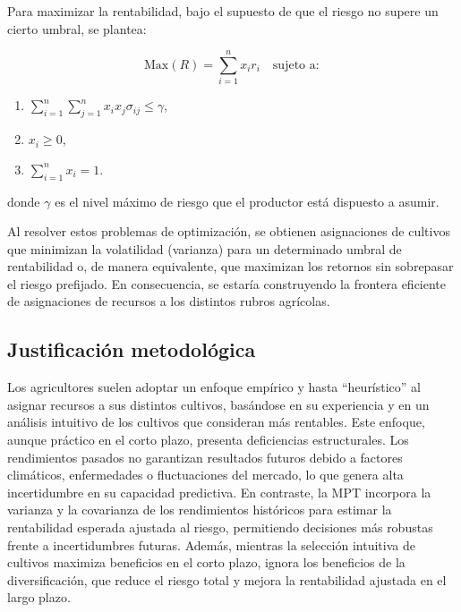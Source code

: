\documentclass[
  letterpaper,
  DIV=11,
  numbers=noendperiod]{scrartcl}
\providecommand{\tightlist}{%
  \setlength{\itemsep}{0pt}\setlength{\parskip}{0pt}}\usepackage{longtable,booktabs,array}
\begin{document}
Para maximizar la rentabilidad, bajo el supuesto de que el riesgo no
supere un cierto umbral, se plantea:

\[
\text{Max}(R) = \sum_{i=1}^n x_i r_i \quad \text{sujeto a}:
\]

\begin{enumerate}
\def\labelenumi{\arabic{enumi}.}
\tightlist
\item
  \(\sum_{i=1}^n \sum_{j=1}^n x_i x_j \sigma_{ij} \leq \gamma\),\\
\item
  \(x_i \geq 0\),\\
\item
  \(\sum_{i=1}^n x_i = 1\).
\end{enumerate}

donde \(\gamma\) es el nivel máximo de riesgo que el productor está
dispuesto a asumir.

Al resolver estos problemas de optimización, se obtienen asignaciones de
cultivos que minimizan la volatilidad (varianza) para un determinado
umbral de rentabilidad o, de manera equivalente, que maximizan los
retornos sin sobrepasar el riesgo prefijado. En consecuencia, se estaría
construyendo la frontera eficiente de asignaciones de recursos a los
distintos rubros agrícolas.

\subsection{Justificación
metodológica}\label{justificaciuxf3n-metodoluxf3gica}

Los agricultores suelen adoptar un enfoque empírico y hasta
``heurístico'' al asignar recursos a sus distintos cultivos, basándose
en su experiencia y en un análisis intuitivo de los cultivos que
consideran más rentables. Este enfoque, aunque práctico en el corto
plazo, presenta deficiencias estructurales. Los rendimientos pasados no
garantizan resultados futuros debido a factores climáticos, enfermedades
o fluctuaciones del mercado, lo que genera alta incertidumbre en su
capacidad predictiva. En contraste, la MPT incorpora la varianza y la
covarianza de los rendimientos históricos para estimar la rentabilidad
esperada ajustada al riesgo, permitiendo decisiones más robustas frente
a incertidumbres futuras. Además, mientras la selección intuitiva de
cultivos maximiza beneficios en el corto plazo, ignora los beneficios de
la diversificación, que reduce el riesgo total y mejora la rentabilidad
ajustada en el largo plazo.
\end{document}

